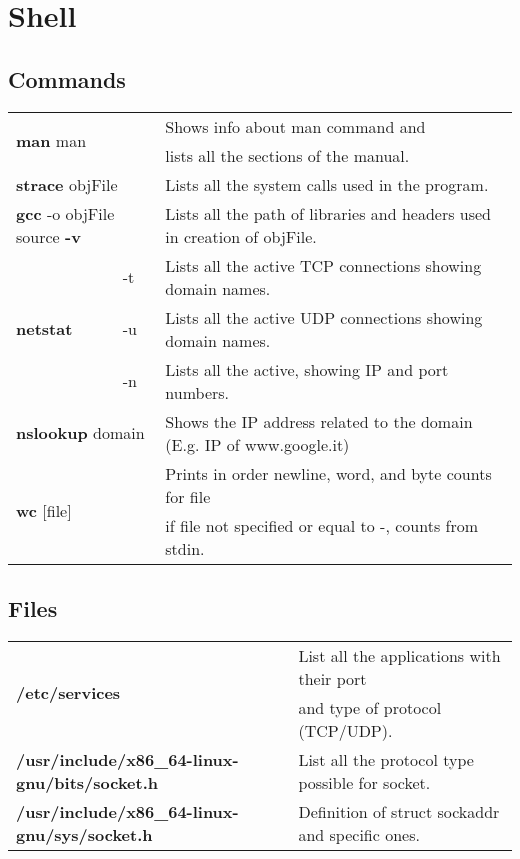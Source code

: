 \chapter{Shell}

\section{Commands}

\begin{table}[h]
\centering
\footnotesize
\begin{tabular}{|l|l|l|}
\hline
\multicolumn{2}{|l|}{\multirow{2}{*}{\textbf{man} man}}&{Shows info about man command and}\\
\multicolumn{2}{|l|}{} & {lists all the sections of the manual.}\\
\hline
\multicolumn{2}{|l|}{\textbf{strace} objFile} & {Lists all the system calls used in the program.}\\
\hline
\multicolumn{2}{|l|}{\textbf{gcc} -o objFile source \textbf{-v}} & {Lists all the path of libraries and headers used in creation of objFile.}\\
\hline
\multirow{3}{*}{\textbf{netstat}} & {-t} & {Lists all the active TCP connections showing domain names.}\\
\cline{2-3}
& {-u} & {Lists all the active UDP connections showing domain names.}\\
\cline{2-3}
& {-n} & {Lists all the active, showing IP and port numbers.}\\
\hline
\multicolumn{2}{|l|}{\textbf{nslookup} domain} & {Shows the IP address related to the domain (E.g. IP of www.google.it)}\\
\hline
\multicolumn{2}{|l|}{\multirow{2}{*}{\textbf{wc} [file]}} & {Prints in order newline, word, and byte counts for file}\\
\multicolumn{2}{|l|}{} & {if file not specified or equal to -, counts from stdin.}\\
\hline
\end{tabular}
\end{table}


\section{Files}

\begin{table}[h]
\centering
\footnotesize
\begin{tabular}{|l|l|}
\hline
\multirow{2}{*}{\textbf{/etc/services}} & {List all the applications with their port}\\
& {and type of protocol (TCP/UDP).}\\
\hline
{\textbf{/usr/include/x86\_64-linux-gnu/bits/socket.h}} & {List all the protocol type possible for socket.}\\
\hline
{\textbf{/usr/include/x86\_64-linux-gnu/sys/socket.h}} & {Definition of struct sockaddr and specific ones.}\\
\hline
\end{tabular}
\end{table}

